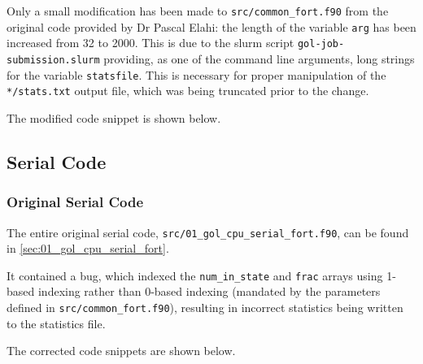 \documentclass[]{article}
\begin{document}
Only a small modification has been made to
\lstinline[style=ff]{src/common_fort.f90} from the original code provided by Dr
Pascal Elahi: the length of the variable \lstinline{arg} has been increased from
32 to 2000.
This is due to the slurm script \lstinline[style=ff]{gol-job-submission.slurm}
providing, as one of the command line arguments, long strings for the variable
\lstinline{statsfile}.
This is necessary for proper manipulation of the
\lstinline[style=ff]{*/stats.txt} output file, which was being truncated prior
to the change.

The modified code snippet is shown below.



\subsection{Serial Code}
\label{sec:serial-code}

\subsubsection{Original Serial Code}
\label{sec:original-serial-code}

The entire original serial code,
\lstinline[style=ff]{src/01_gol_cpu_serial_fort.f90}, can be found in
\autoref{sec:01_gol_cpu_serial_fort}.

It contained a bug, which indexed the \lstinline{num_in_state} and
\lstinline{frac} arrays using 1-based indexing rather than 0-based indexing
(mandated by the parameters defined in
\lstinline[style=ff]{src/common_fort.f90}), resulting in incorrect statistics
being written to the statistics file.

The corrected code snippets are shown below.




\end{document}
